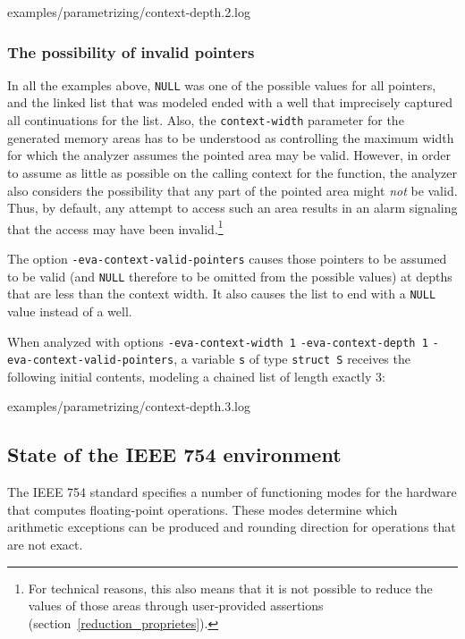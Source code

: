 \documentclass[web]{frama-c-book}
\begin{document}

  {examples/parametrizing/context-depth.2.log}
                                           
\subsubsection{The possibility of invalid pointers}

In all the examples above, \lstinline|NULL| was one of the
possible values for all pointers, and the linked list that was
modeled ended with a well that imprecisely captured all continuations
for the list. Also, the \lstinline|context-width| parameter
for the generated memory areas has to be understood as controlling the maximum
width for which the analyzer assumes the pointed area may be valid.
However, in order to assume as little as possible on the calling context
for the function, the analyzer also
considers the possibility that any part of the pointed area might \emph{not} be
valid. Thus, by default, any attempt to access such an area results in an alarm
signaling that the access may have been invalid.\footnote{For technical
reasons, this also means that it is not possible to reduce the values
of those areas through user-provided assertions
(section~\ref{reduction_proprietes}).
}

The option \lstinline|-eva-context-valid-pointers| causes
those pointers to be assumed to be valid (and
\lstinline|NULL| therefore to be omitted from the possible values) 
at depths that are less than the context width.
It also causes the list to end with a
\lstinline|NULL| value instead of a well.

When analyzed with options
\lstinline|-eva-context-width 1| \lstinline|-eva-context-depth 1|
\lstinline|-eva-context-valid-pointers|,
a variable \lstinline|s| of
type \lstinline|struct S| receives  the following initial contents,
modeling a chained list of length exactly 3:


  {examples/parametrizing/context-depth.3.log}

\subsection{State of the IEEE 754 environment}

The IEEE 754 standard specifies a number of functioning modes for
the hardware that computes floating-point operations. These modes
determine which arithmetic exceptions can be produced and rounding
direction for operations that are not exact.
\end{document}
